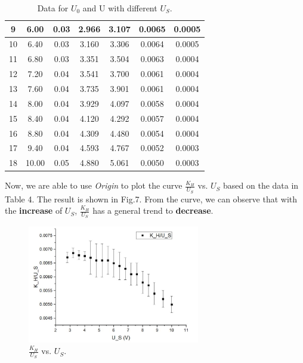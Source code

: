 \documentclass[a4paper,12pt]{article}
\begin{document}
\begin{table}[H]
\begin{center}
\begin{tabular}{|c|c|c|c|c|c|c|}
9 & 6.00 & 0.03 & 2.966 & 3.107 & 0.0065 & 0.0005 \\ \hline
10 & 6.40 & 0.03 & 3.160 & 3.306 & 0.0064 & 0.0005 \\ \hline
11 & 6.80 & 0.03 & 3.351 & 3.504 & 0.0063 & 0.0004 \\ \hline
12 & 7.20 & 0.04 & 3.541 & 3.700 & 0.0061 & 0.0004 \\ \hline
13 & 7.60 & 0.04 & 3.735 & 3.901 & 0.0061 & 0.0004 \\ \hline
14 & 8.00 & 0.04 & 3.929 & 4.097 & 0.0058 & 0.0004 \\ \hline
15 & 8.40 & 0.04 &4.120 & 4.292 & 0.0057 & 0.0004 \\ \hline
16 & 8.80 & 0.04 & 4.309 & 4.480 & 0.0054 & 0.0004 \\ \hline
17 & 9.40 & 0.04 & 4.593 & 4.767 & 0.0052 & 0.0003 \\ \hline
18 & 10.00 & 0.05 & 4.880 & 5.061 & 0.0050 & 0.0003 \\ \hline
\end{tabular}
\caption{Data for $U_0$ and U with different $U_S$.}
\end{center}
\end{table}

Now, we are able to use \textit{Origin} to plot the curve $\frac{K_H}{U_S}$ vs. $U_S$ based on the data in Table 4. The result is shown in Fig.7. From the curve, we can observe that with the \textbf{increase} of $U_S$, $\frac{K_H}{U_S}$ has a general trend to \textbf{decrease}.

\newpage
\begin{figure}[H] 
    \centering
    \includegraphics[width=0.67\textwidth]{p1} 
    \caption{$\frac{K_H}{U_S}$ vs. $U_S$.} 
\end{figure}
\end{document}
